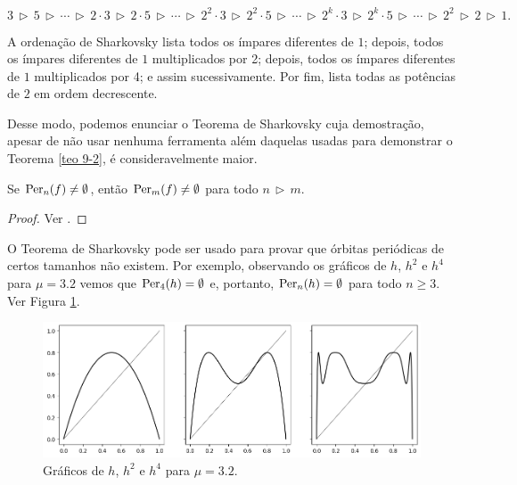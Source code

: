\begin{definition}
$$3 \, \triangleright \, 5 
\, \triangleright \, \cdots \, \triangleright \,
2 \cdot 3 \, \triangleright \, 2 \cdot 5 
\, \triangleright \, \cdots \, \triangleright \,
2^2 \cdot 3 \, \triangleright \, 2^2 \cdot 5
\, \triangleright \, \cdots \, \triangleright \,
2^k \cdot 3 \, \triangleright \, 2^k \cdot 5
\, \triangleright \, \cdots \, \triangleright \,
2^2 \, \triangleright \, 2 \, \triangleright \, 1.$$
\end{definition}

A ordenação de Sharkovsky lista todos os ímpares diferentes de $1$; depois, todos os ímpares diferentes de $1$ multiplicados por 2; depois, todos os ímpares diferentes de $1$ multiplicados por 4; e assim sucessivamente. Por fim, lista todas as potências de $2$ em ordem decrescente.

Desse modo, podemos enunciar o Teorema de Sharkovsky cuja demostração, apesar de não usar nenhuma ferramenta além daquelas usadas para demonstrar o Teorema \ref{teo 9-2}, é consideravelmente maior.

\begin{theorem}[Sharkovsky]
Se $\operatorname{Per}_n(f) \neq \emptyset$, então $\operatorname{Per}_m(f) \neq \emptyset$ para todo $n \, \triangleright \, m$.
\end{theorem}

\begin{proof}
Ver \cite{burns}.
\end{proof}

O Teorema de Sharkovsky pode ser usado para provar que órbitas periódicas de certos tamanhos não existem. Por exemplo, observando os gráficos de $h$, $h^2$ e $h^4$ para $\mu = 3.2$ vemos que $\operatorname{Per}_4(h) = \emptyset$ e, portanto, $\operatorname{Per}_n(h) = \emptyset$ para todo $n \geq 3$. Ver Figura \ref{h_3,2}.

\begin{figure}[!htb]
\centering
\includegraphics[scale=0.6]{images/h_3,2.png}
\caption{Gráficos de $h$, $h^2$ e $h^4$ para $\mu = 3.2$.}
\label{h_3,2}
\end{figure}


